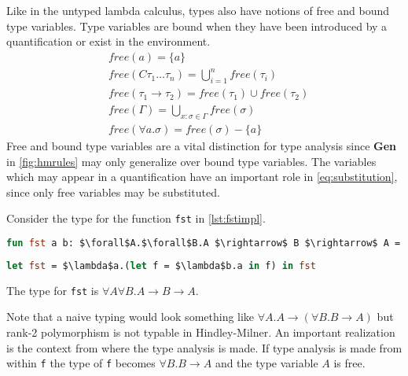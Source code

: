 \documentclass[11pt,oneside,a4paper]{report}
\begin{document}
Like in the untyped lambda calculus, types also have notions of free and bound type variables.
Type variables are bound when they have been introduced by a quantification or exist in the environment.
\begin{align}
	 & \textit{free}(a) = \{ a \}                                                              \\
	 & \textit{free}(C \tau_1 \dots \tau_n ) = \bigcup_{i = 1}^n \textit{free}(\tau_i)           \\
     & \textit{free}(\tau_1 \rightarrow \tau_2) = \textit{free}(\tau_1) \cup \textit{free}(\tau_2)          \\
	 & \textit{free}(\Gamma) = \bigcup_{x:\sigma \in \Gamma} \textit{free}(\sigma)             \\
	 & \textit{free}(\forall a . \sigma) = \textit{free}(\sigma) - \{ a \}                     
\end{align}
Free and bound type variables are a vital distinction for type analysis since \textbf{Gen} in \autoref{fig:hmrules} may only generalize over bound type variables.
The variables which may appear in a quantification have an important role in \autoref{eq:substitution}, since only free variables may be substituted.
\begin{exmp}
Consider the type for the function \texttt{fst} in \autoref{lst:fstimpl}.
\begin{lstlisting}[language=ML,caption={First function},label={lst:fstimplbad},mathescape=true]
fun fst a b: $\forall$A.$\forall$B.A $\rightarrow$ B $\rightarrow$ A = a;
\end{lstlisting}
\begin{lstlisting}[language=ML,caption={First function in lambda calculus},label={lst:fstimpl},mathescape=true]
let fst = $\lambda$a.(let f = $\lambda$b.a in f) in fst
\end{lstlisting}
    The type for \texttt{fst} is $\forall A \forall B . A \rightarrow B \rightarrow A$.

    Note that a naive typing would look something like $\forall A  . A \rightarrow (\forall B . B \rightarrow A)$ but rank-2 polymorphism is not typable in Hindley-Milner.
    An important realization is the context from where the type analysis is made.
    If type analysis is made from within \texttt{f} the type of \texttt{f} becomes $\forall B . B \rightarrow A$ and the type variable $A$ is free.
\end{exmp}
\end{document}
